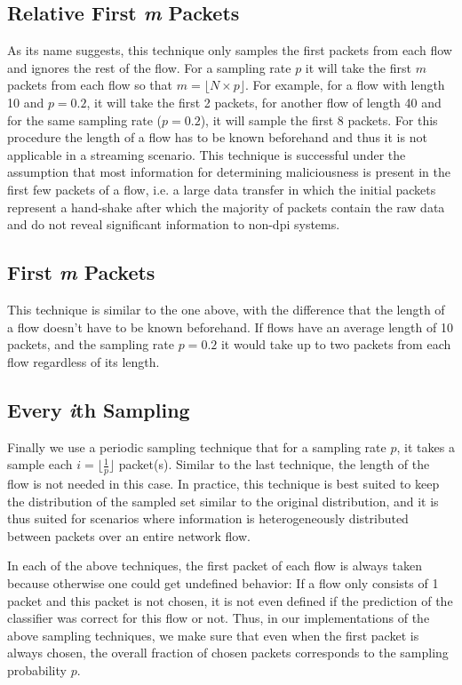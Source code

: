 \documentclass[conference]{IEEEtran}
\begin{document}
\subsection{Relative First \emph{m} Packets}
As its name suggests, this technique only samples the first packets from each flow and ignores the rest of the flow. For a sampling rate $p$ it will take the first $m$ packets from each flow so that $m = \lfloor N \times p \rfloor$. For example, for a flow with length 10 and $p=0.2$, it will take the first 2 packets, for another flow of length 40 and for the same sampling rate ($p=0.2$), it will sample the first 8 packets. For this procedure the length of a flow has to be known beforehand and thus it is not applicable in a streaming scenario. This technique is successful under the assumption that most information for determining maliciousness is present in the first few packets of a flow, i.e. a large data transfer in which the initial packets represent a hand-shake after which the majority of packets contain the raw data and do not reveal significant information to non-\gls{dpi} systems.

\subsection{First \emph{m} Packets}
This technique is similar to the one above, with the difference that the length of a flow doesn't have to be known beforehand. If flows have an average length of 10 packets, and the sampling rate $p=0.2$ it would take up to two packets from each flow regardless of its length.

\subsection{Every \emph{i}th Sampling}
Finally we use a periodic sampling technique that for a sampling rate $p$, it takes a sample each $i= \lfloor \frac{1}{p} \rfloor$ packet(s). Similar to the last technique, the length of the flow is not needed in this case. In practice, this technique is best suited to keep the distribution of the sampled set similar to the original distribution, and it is thus suited for scenarios where information is heterogeneously distributed between packets over an entire network flow.

In each of the above techniques, the first packet of each flow is always taken because otherwise one could get undefined behavior: If a flow only consists of 1 packet and this packet is not chosen, it is not even defined if the prediction of the classifier was correct for this flow or not. Thus, in our implementations of the above sampling techniques, we make sure that even when the first packet is always chosen, the overall fraction of chosen packets corresponds to the sampling probability $p$.
\end{document}
